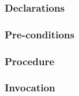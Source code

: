 \def\Subsubsection#1{\subsubsection{#1}}

\Subsubsection{Declarations}

\Subsubsection{Pre-conditions}

\enlargethispage*{\baselineskip}
\enlargethispage*{\baselineskip}
\Subsubsection{Procedure}
\pagebreak

\Subsubsection{Invocation}
